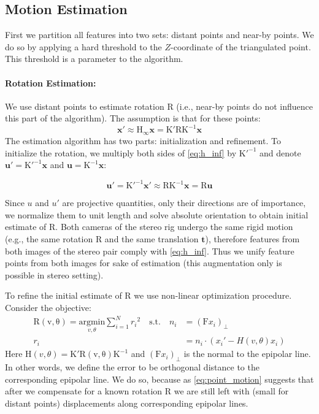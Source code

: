 \documentclass[runningheads]{llncs}
\begin{document}
\subsection{Motion Estimation}

First we partition all features into two sets: distant points and
near-by points.  We do so by applying a hard threshold to the
$Z$-coordinate of the triangulated point.  This threshold is a
parameter to the algorithm.

\paragraph{Rotation Estimation:} We use distant points to estimate
rotation $\mathrm{R}$ (i.e., near-by points do not influence this part
of the algorithm). The assumption is that for these points:
\begin{equation}\label{eq:h_inf}
\mathbf{x}' \approx \mathrm{H}_\infty\mathbf{x} = \mathrm{K'RK^{-1}}\mathbf{x}
\end{equation}
The estimation algorithm has two parts: initialization and
refinement. To initialize the rotation, we multiply both sides of
\ref{eq:h_inf} by $\mathrm{K'^{-1}}$ and denote $\mathbf{u'} =
\mathrm{K'^{-1}}\mathbf{x}$ and $\mathbf{u} =
\mathrm{K^{-1}}\mathbf{x}$:

\begin{equation}
  \mathbf{u'} = \mathrm{K'^{-1}}\mathbf{x}' \approx \mathrm{RK^{-1}}\mathbf{x} = \mathrm{R}\mathbf{u}
\end{equation}

Since $u$ and $u'$ are projective quantities, only their directions
are of importance, we normalize them to unit length and solve absolute
orientation \cite{Horn1987} to obtain initial estimate of
$\mathrm{R}$. Both cameras of the stereo rig undergo the same rigid
motion (e.g., the same rotation $\mathrm{R}$ and the same translation
$\mathbf{t}$), therefore features from both images of the stereo pair
comply with \ref{eq:h_inf}. Thus we unify feature points from both
images for sake of estimation (this augmentation only is possible in
stereo setting).

To refine the initial estimate of $\mathrm{R}$ we use non-linear
optimization procedure.  Consider the objective:
\begin{equation}
  \begin{split}
    \mathrm{R(v,\theta)} = \underset{v,\theta}{\mathrm{argmin}}
    \sum_{i=1}^N{r_i}^2\quad \text{s.t.}\quad n_i &=
    (\mathrm{F}x_i)_\perp \\ r_i&=n_i\cdot (x_i'-H(v,\theta)x_i)
  \end{split}
\end{equation}
Here $\mathrm{H}(v,\theta) = \mathrm{K'R(v,\theta)K^{-1}}$ and
$(\mathrm{F}x_i)_\perp$ is the normal to the epipolar line.  In other
words, we define the error to be orthogonal distance to the
corresponding epipolar line.  We do so, because as
\ref{eq:point_motion} suggests that after we compensate for a known
rotation $\mathrm{R}$ we are still left with (small for distant
points) displacements along corresponding epipolar lines.
\end{document}
